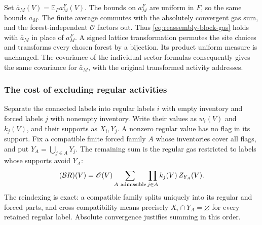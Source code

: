 Set $\bar a_M(V)=\mathbb E_Fa_M^F(V)$. The bounds on $a_M^F$ are
uniform in $F$, so the same bounds $\bar a_M$. The finite
average commutes with the absolutely convergent gas sum, and the
forest-independent $\mathscr O$ factors out. Thus
\eqref{eq:reassembly-block-gas} holds with $\bar a_M$ in place of
$a_M^F$. A signed lattice transformation permutes the site choices
and transforms every chosen forest by a bijection. Its product
uniform measure is unchanged. The covariance of the individual
sector formulas consequently gives the same covariance for
$\bar a_M$, with the original transformed activity addresses.

\subsubsection{The cost of excluding regular activities}
Separate the connected labels into regular labels $i$ with empty
inventory and forced labels $j$ with nonempty inventory. Write their
values as $w_i(V)$ and $k_j(V)$, and their supports as $X_i,Y_j$.
A nonzero regular value has no flag in its support. Fix a compatible
finite forced family $A$ whose inventories cover all flags, and put
$Y_A=\bigcup_{j\in A}Y_j$. The remaining sum is the regular gas
restricted to labels whose supports avoid $Y_A$:
\begin{equation}\label{eq:forest-forced-first}
 (\mathcal BR)(V)=\mathscr O(V)
       \sum_{A\ {\rm admissible}}\prod_{j\in A}k_j(V)\,Z_{Y_A}(V).
\end{equation}
The reindexing is exact: a compatible family splits uniquely into
its regular and forced parts, and cross compatibility means precisely
$X_i\cap Y_A=\varnothing$ for every retained regular label.
Absolute convergence justifies summing in this order.

